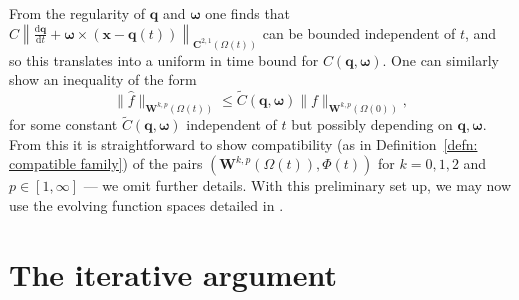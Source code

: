\documentclass[a4paper]{amsart}
\numberwithin{equation}{section}
\theoremstyle{plain}
\newcommand{\mbf}[1]{\mathbf{#1}}
\begin{document}
From the regularity of $\mbf{q}$ and $\boldsymbol{\omega}$ one finds that $C \left\| \frac{\mathrm{d}\mbf{q}}{\mathrm{d}t} + \boldsymbol{\omega} \times (\mbf{x} - \mbf{q}(t)) \right\|_{\mbf{C}^{2,1}(\Omega(t))}$ can be bounded independent of $t$, and so this translates into a uniform in time bound for $C(\mbf{q}, \boldsymbol{\omega})$.
One can similarly show an inequality of the form
\[ \| \widehat{f} \|_{\mbf{W}^{k,p}(\Omega(t))} \leq \widetilde{C}(\mbf{q}, \boldsymbol{\omega})\| {f} \|_{\mbf{W}^{k,p}(\Omega(0))},  \]
for some constant $\widetilde{C}(\mbf{q}, \boldsymbol{\omega})$ independent of $t$ but possibly depending on $\mbf{q}, \boldsymbol{\omega}$.
From this it is straightforward to show compatibility (as in Definition~\ref{defn: compatible family}) of the pairs $(\mbf{W}^{k,p}(\Omega(t)), \Phi(t))$ for $k=0,1,2$ and $p \in [1,\infty]$ --- we omit further details.
With this preliminary set up, we may now use the evolving function spaces detailed in \cite{alphonse2023function,alphonse2015abstract}.

\section{The iterative argument}
\label{section:FSI iteration}
\end{document}
